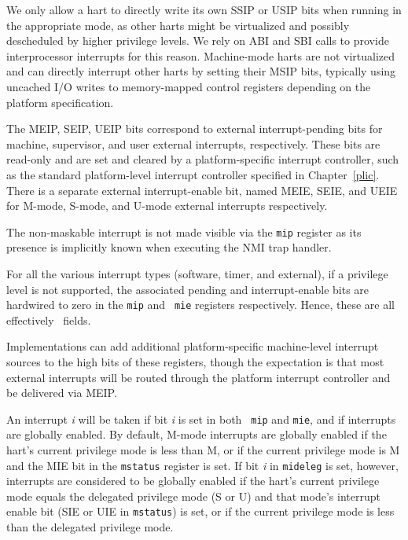 \begin{commentary}
We only allow a hart to directly write its own SSIP or USIP
bits when running in the appropriate mode, as other harts might be
virtualized and possibly descheduled by higher privilege levels.  We
rely on ABI and SBI calls to provide interprocessor interrupts
for this reason.  Machine-mode harts are not virtualized and can
directly interrupt other harts by setting their MSIP bits, typically
using uncached I/O writes to memory-mapped control registers depending
on the platform specification.
\end{commentary}

The MEIP, SEIP, UEIP bits correspond to external interrupt-pending
bits for machine, supervisor, and user external interrupts,
respectively.  These bits are read-only and are set and cleared by a
platform-specific interrupt controller, such as the standard
platform-level interrupt controller specified in Chapter~\ref{plic}.
There is a separate external interrupt-enable bit, named MEIE, SEIE,
and UEIE for M-mode, S-mode, and U-mode external interrupts
respectively.

\begin{commentary}
The non-maskable interrupt is not made visible via the {\tt mip}
register as its presence is implicitly known when executing the NMI
trap handler.
\end{commentary}

For all the various interrupt types (software, timer, and external),
if a privilege level is not supported, the associated pending and
interrupt-enable bits are hardwired to zero in the {\tt mip} and {\tt
  mie} registers respectively.  Hence, these are all effectively
\warl\ fields.

\begin{commentary}
Implementations can add additional platform-specific machine-level
interrupt sources to the high bits of these registers, though the
expectation is that most external interrupts will be routed through
the platform interrupt controller and be delivered via MEIP.
\end{commentary}

An interrupt {\em i} will be taken if bit {\em i} is set in both {\tt
  mip} and {\tt mie}, and if interrupts are globally enabled.  By
default, M-mode interrupts are globally enabled if the hart's current
privilege mode is less than M, or if the current privilege mode is M
and the MIE bit in the {\tt mstatus} register is set.  If bit {\em i}
in {\tt mideleg} is set, however, interrupts are considered to be
globally enabled if the hart's current privilege mode equals the
delegated privilege mode (S or U) and that mode's interrupt enable
bit (SIE or UIE in {\tt mstatus}) is set, or if the current
privilege mode is less than the delegated privilege mode.

